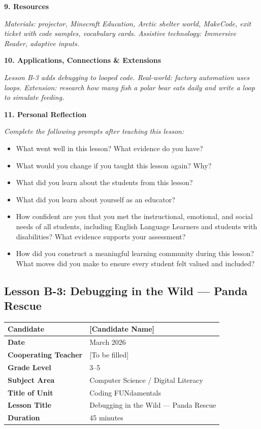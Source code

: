 \documentclass[11pt,letterpaper]{article}
\begin{document}
\textbf{9. Resources}

\textit{Materials: projector, Minecraft Education, Arctic shelter world, MakeCode, exit ticket with code samples, vocabulary cards. Assistive technology: Immersive Reader, adaptive inputs.}

\textbf{10. Applications, Connections \& Extensions}

\textit{Lesson B-3 adds debugging to looped code. Real-world: factory automation uses loops. Extension: research how many fish a polar bear eats daily and write a loop to simulate feeding.}

\textbf{11. Personal Reflection}

\textit{Complete the following prompts after teaching this lesson:}

\begin{itemize}
  \item What went well in this lesson? What evidence do you have?

  \item What would you change if you taught this lesson again? Why?

  \item What did you learn about the students from this lesson?

  \item What did you learn about yourself as an educator?

  \item How confident are you that you met the instructional, emotional, and social needs of all students, including English Language Learners and students with disabilities? What evidence supports your assessment?

  \item How did you construct a meaningful learning community during this lesson? What moves did you make to ensure every student felt valued and included?
\end{itemize}

\newpage
\subsection{Lesson B-3: Debugging in the Wild --- Panda Rescue}
\label{sub:LessonB3DebuggingintheWildPandaRescue}

\begin{longtable}{|L{0.28\textwidth}|L{0.65\textwidth}|}
\hline
\textbf{Candidate}  & [Candidate Name]  \\
\hline
\textbf{Date}  & March 2026  \\
\hline
\textbf{Cooperating Teacher}  & [To be filled]  \\
\hline
\textbf{Grade Level}  & 3--5  \\
\hline
\textbf{Subject Area}  & Computer Science / Digital Literacy  \\
\hline
\textbf{Title of Unit}  & Coding FUNdamentals  \\
\hline
\textbf{Lesson Title}  & Debugging in the Wild --- Panda Rescue  \\
\hline
\textbf{Duration}  & 45 minutes  \\
\hline
\end{longtable}
\end{document}
